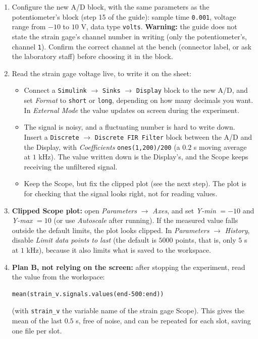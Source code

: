 \documentclass[a4paper,11pt]{article}
\begin{document}
\begin{enumerate}[label=$\square$, leftmargin=1.5em]
  \item Configure the new A/D block, with the same parameters as the
  potentiometer's block (step 15 of the guide): sample time \texttt{0.001},
  voltage range from $-10$ to $10$ V, data type \texttt{volts}.
  \textbf{Warning:} the guide does not state the strain gage's channel number in
  writing (only the potentiometer's, channel \texttt{1}). Confirm the correct
  channel at the bench (connector label, or ask the laboratory staff) before
  choosing it in the block.

  \item Read the strain gage voltage live, to write it on the sheet:
  \begin{itemize}
    \item Connect a \texttt{Simulink} $\to$ \texttt{Sinks} $\to$ \texttt{Display}
    block to the new A/D, and set \emph{Format} to \texttt{short} or \texttt{long},
    depending on how many decimals you want. In \emph{External Mode} the value
    updates on screen during the experiment.
    \item The signal is noisy, and a fluctuating number is hard to write down.
    Insert a \texttt{Discrete} $\to$ \texttt{Discrete FIR Filter} block between the
    A/D and the Display, with \emph{Coefficients} \texttt{ones(1,200)/200} (a
    $0.2$ s moving average at $1$ kHz). The value written down is the Display's,
    and the Scope keeps receiving the unfiltered signal.
    \item Keep the Scope, but fix the clipped plot (see the next step). The plot is
    for checking that the signal looks right, not for reading values.
  \end{itemize}

  \item \textbf{Clipped Scope plot:} open \emph{Parameters} $\to$ \emph{Axes}, and
  set \emph{Y-min} $= -10$ and \emph{Y-max} $= 10$ (or use \emph{Autoscale} after
  running). If the measured value falls outside the default limits, the plot looks
  clipped. In \emph{Parameters} $\to$ \emph{History}, disable \emph{Limit data
  points to last} (the default is $5000$ points, that is, only $5$ s at $1$ kHz),
  because it also limits what is saved to the workspace.

  \item \textbf{Plan B, not relying on the screen:} after stopping the experiment,
  read the value from the workspace:
  \begin{verbatim}
mean(strain_v.signals.values(end-500:end))
  \end{verbatim}
  (with \texttt{strain\_v} the variable name of the strain gage Scope). This gives
  the mean of the last $0.5$ s, free of noise, and can be repeated for each slot,
  saving one file per slot.


\end{enumerate}
\end{document}
